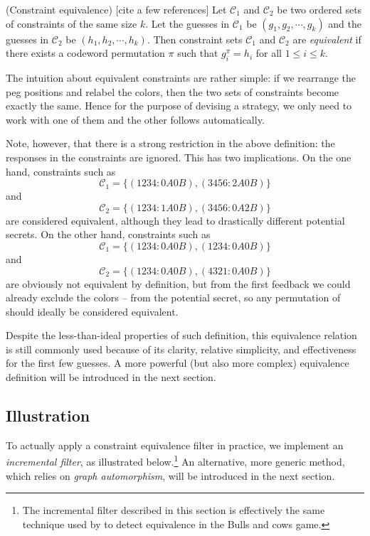 \begin{definition}
(Constraint equivalence) [cite a few references] Let $\mathcal{C}_1$ and $\mathcal{C}_2$ be two ordered sets of constraints of the same size $k$. Let the guesses in $\mathcal{C}_1$ be $(g_1,g_2,\cdots,g_k)$ and the guesses in $\mathcal{C}_2$ be $(h_1,h_2,\cdots,h_k)$. Then constraint sets $\mathcal{C}_1$ and $\mathcal{C}_2$ are \emph{equivalent} if there exists a codeword permutation $\pi$ such that
$g_i^\pi = h_i$ for all $1 \le i \le k$.
\end{definition}

The intuition about equivalent constraints are rather simple: if we rearrange the peg positions and relabel the colors, then the two sets of constraints become exactly the same. Hence for the purpose of devising a strategy, we only need to work with one of them and the other follows automatically.

Note, however, that there is a strong restriction in the above definition: the responses in the constraints are ignored. This has two implications. On the one hand, constraints such as 
\[
\mathcal{C}_1 = \{ (1234:0A0B), (3456:2A0B) \}
\]
and
\[
\mathcal{C}_2 = \{ (1234:1A0B), (3456:0A2B) \}
\]
are considered equivalent, although they lead to drastically different potential secrets. On the other hand, constraints such as
\[
\mathcal{C}_1 = \{ (1234:0A0B), (1234:0A0B) \}
\]
and
\[
\mathcal{C}_2 = \{ (1234:0A0B), (4321:0A0B) \}
\]
are obviously not equivalent by definition, but from the first feedback  we could already exclude the colors  --  from the potential secret, so any permutation of  should ideally be considered equivalent.

Despite the less-than-ideal properties of such definition, this equivalence relation is still commonly used \cite{neuwirth81,koyama93,francis10} because of its clarity, relative simplicity, and effectiveness for the first few guesses. A more powerful (but also more complex) equivalence definition will be introduced in the next section.

\subsection{Illustration}

To actually apply a constraint equivalence filter in practice, we implement an \emph{incremental filter}, as illustrated below.\footnote{The incremental filter described in this section is effectively the same technique used by \cite{francis10} to detect equivalence in the Bulls and cows game.}
An alternative, more generic method, which relies on \emph{graph automorphism}, will be introduced in the next section.

